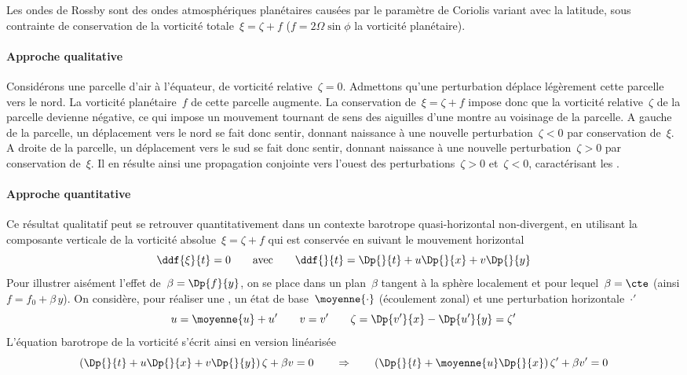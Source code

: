 \sk
Les ondes de Rossby sont des ondes atmosphériques planétaires causées par 
le paramètre de Coriolis variant avec la latitude,
sous contrainte de conservation de la vorticité totale~$\xi = \zeta + f$
($f=2\Omega\sin\phi$ la vorticité planétaire).

\paragraph{Approche qualitative} Considérons une parcelle d'air à l'équateur, de vorticité relative~$\zeta = 0$.
Admettons qu'une perturbation déplace légèrement cette parcelle vers le nord.
La vorticité planétaire~$f$ de cette parcelle augmente.
La conservation de~$\xi = \zeta + f$ impose donc
que la vorticité relative~$\zeta$ de la parcelle devienne négative,
ce qui impose un mouvement tournant de sens des aiguilles d'une montre
au voisinage de la parcelle.
A gauche de la parcelle, un déplacement vers le nord se fait
donc sentir, donnant naissance à une nouvelle perturbation~$\zeta < 0$ par conservation de~$\xi$.
A droite de la parcelle, un déplacement vers le sud se fait
donc sentir, donnant naissance à une nouvelle perturbation~$\zeta > 0$ par conservation de~$\xi$.
Il en résulte ainsi une propagation conjointe vers l'ouest 
des perturbations~$\zeta > 0$ et~$\zeta < 0$,
caractérisant les .

\paragraph{Approche quantitative}
Ce résultat qualitatif peut se retrouver quantitativement
dans un contexte barotrope quasi-horizontal non-divergent,
en utilisant la composante verticale de la vorticité absolue~$\xi = \zeta + f$
qui est conservée en suivant le mouvement horizontal
\[ 
\ddf{\xi}{t} = 0 
\qquad
\textrm{avec}
\qquad
\ddf{}{t} = \Dp{}{t} + u \Dp{}{x} + v \Dp{}{y}
\]
Pour illustrer aisément l'effet de~$\beta = \Dp{f}{y}$,
on se place dans un plan~$\beta$ tangent à la sphère localement
et pour lequel~$\beta = \cte$ (ainsi $f = f_0 + \beta\,y$).
On considère, pour réaliser une ,
un état de base~$\moyenne{\cdot}$ (écoulement zonal)
et une perturbation horizontale~$\cdot'$
\[
u = \moyenne{u} + u' 
\qquad 
v = v' 
\qquad 
\zeta = \Dp{v'}{x} - \Dp{u'}{y} = \zeta'
\]
\noindent L'équation barotrope de la vorticité s'écrit ainsi en version linéarisée
\[ 
\left( \Dp{}{t} + u \Dp{}{x} + v \Dp{}{y} \right) \zeta + \beta v = 0
\qquad
\Rightarrow
\qquad
\left( \Dp{}{t} + \moyenne{u} \Dp{}{x} \right) \zeta' + \beta v' = 0
\]

